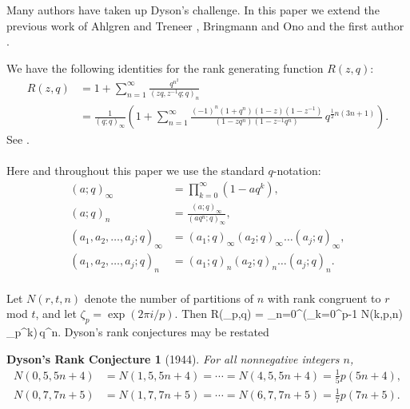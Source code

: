 \documentclass[12pt]{amsart}
\newtheorem{drconj}[theorem]{Dyson's Rank Conjecture}
\theoremstyle{definition}
\theoremstyle{remark}
\numberwithin{equation}{section}
\newcommand\Lpar[1]{\left(#1\right)}
\begin{document}
Many authors have taken up Dyson's challenge. In this paper 
we extend the previous work of Ahlgren and Treneer \cite{Ah-Tr08},
Bringmann and Ono \cite{Br-On10} and the first author \cite{Ga19a}.

We have the following identities for the rank generating function $R(z,q)$:
\begin{align}
R(z,q) 
&= 1 + \sum_{n=1}^\infty \frac{q^{n^2}}{(zq,z^{-1}q;q)_n}
\label{eq:Rzqid1}\\
&= \frac{1}{(q;q)_\infty} \Lpar{1 + \sum_{n=1}^\infty 
   \frac{(-1)^n (1 + q^n)(1-z)(1-z^{-1})}
   {(1 - zq^n)(1 - z^{-1}q^n)} \, q^{\frac{1}{2}n(3n+1)}}.
\label{eq:Rzqid2}
\end{align}
See \cite[Eqs (7.2), (7.6)]{Ga88a}.
\\\\
Here and throughout this paper we use the standard $q$-notation:
\begin{align*}
(a;q)_{\infty} &= \prod_{k=0}^\infty (1-aq^k),
\\
(a;q)_{n} &= \frac{(a;q)_{\infty}}{(aq^n;q)_{\infty}},
\\
(a_1,a_2,\dots,a_j;q)_{\infty} 
&= (a_1;q)_{\infty}(a_2;q)_{\infty}\dots(a_j;q)_{\infty},
\\
(a_1,a_2,\dots,a_j;q)_{n} 
&=
(a_1;q)_{n}(a_2;q)_{n}\dots(a_j;q)_{n}.
\end{align*}
\\
Let $N(r,t,n)$ denote the number of partitions of $n$ with rank
congruent to $r$ mod $t$,
and let
$\zeta_p=\exp(2\pi i/p)$. Then
\beq
R(\zeta_p,q) = \sum_{n=0}^\infty \Lpar{\sum_{k=0}^{p-1} N(k,p,n)\,\zeta_p^k}\,q^n.
\label{eq:Rzetaid}
\eeq
Dyson's rank conjectures may be restated

\begin{drconj}[1944]
\label{conj:DRC}
For all nonnegative integers $n$,
\begin{align}
N(0,5,5n+4) &= N(1,5,5n+4) = \cdots  = N(4,5,5n+4) = \tfrac{1}{5}p(5n + 4),
\label{eq:Dysonconj5}\\
N(0,7,7n+5) &= N(1,7,7n+5) = \cdots  = N(6,7,7n+5) = \tfrac{1}{7}p(7n + 5).    
\label{eq:Dysonconj7}
\end{align}
\end{drconj}
\end{document}
